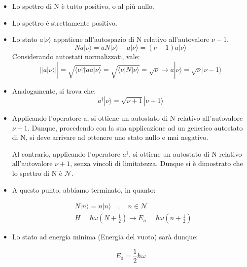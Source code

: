 \documentclass{report}
\begin{document}
\begin{itemize}
  \item Lo spettro di N è tutto positivo, o al più nullo.
  \item Lo spettro è strettamente positivo.
  \item Lo stato $a|\nu\rangle $ appatiene all'autospazio di N relativo all'autovalore $\nu-1$.
        \begin{equation}
          Na|\nu\rangle =aN|\nu\rangle -a|\nu\rangle =(\nu-1)a|\nu\rangle
        \end{equation}
        Considerando autostati normalizzati, vale:
        \begin{equation}
          ||a|\nu\rangle ||= \sqrt{\langle \nu|\dagger a a|\nu\rangle }=\sqrt{\langle \nu|N|\nu\rangle }=\sqrt{\nu} \rightarrow a|\nu\rangle =\sqrt{\nu}|\nu-1\rangle
        \end{equation}
  \item Analogamente, si trova che:
        \begin{equation}
          a^{\dagger}|\nu\rangle =\sqrt{\nu+1}|\nu+1\rangle
        \end{equation}
  \item Applicando l'operatore a, si ottiene un autostato di N relativo all'autovalore $\nu-1$. Dunque,
        procedendo con la sua applicazione ad un generico autostato di N, si deve arrivare ad ottenere uno stato nullo e mai negativo.

        Al contrario, applicando l'operatore $a^{\dagger}$, si ottiene un autostato di N relativo all'autovalore $\nu+1$, senza vincoli di limitatezza.
        Dunque si è dimostrato che lo spettro di N è $\mathcal{N}$.
  \item A questo punto, abbiamo terminato, in quanto:

        \begin{equation}
          \begin{aligned}
             & N |n\rangle =n|n\rangle  \quad , \quad n \in \mathcal{N}                  \\
             & H= \hbar\omega(N+\frac{1}{2}) \rightarrow E_n= \hbar\omega(n+\frac{1}{2})
          \end{aligned}
        \end{equation}
  \item Lo stato ad energia minima (Energia del vuoto) sarà dunque:

        \begin{equation}
          E_0=\frac{1}{2}\hbar \omega
        \end{equation}
\end{itemize}
\end{document}
